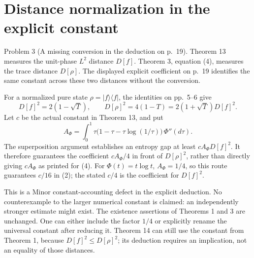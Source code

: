 \documentclass[10pt]{article}
\begin{document}
\section*{Distance normalization in the explicit constant}
Problem 3 (A missing conversion in the deduction on p. 19).  Theorem 13 measures the unit-phase \(L^2\) distance \(D[f]\). Theorem 3, equation (4), measures the trace distance \(D[\rho]\). The displayed explicit coefficient on p. 19 identifies the same constant across these two distances without the conversion.\par
For a normalized pure state \(\rho=|f\rangle\langle f|\), the identities on pp. 5–6 give \[D[f]^2=2(1-\sqrt T),\qquad
 D[\rho]^2=4(1-T)=2(1+\sqrt T)D[f]^2 .\] Let \(c\) be the actual constant in Theorem 13, and put \[A_\Phi=\int_0^1
 \tau\bigl(1-\tau-\tau\log(1/\tau)\bigr)\,\Phi''(d\tau).\] The superposition argument establishes an entropy gap at least \(cA_\Phi D[f]^2\). It therefore guarantees the coefficient \(cA_\Phi/4\) in front of \(D[\rho]^2\), rather than directly giving \(cA_\Phi\) as printed for (4). For \(\Phi(t)=t\log t\), \(A_\Phi=1/4\), so this route guarantees \(c/16\) in (2); the stated \(c/4\) is the coefficient for \(D[f]^2\).\par
This is a Minor constant-accounting defect in the explicit deduction. No counterexample to the larger numerical constant is claimed: an independently stronger estimate might exist. The existence assertions of Theorems 1 and 3 are unchanged. One can either include the factor \(1/4\) or explicitly rename the universal constant after reducing it. Theorem 14 can still use the constant from Theorem 1, because \(D[f]^2\leq D[\rho]^2\); its deduction requires an implication, not an equality of those distances.\par
\end{document}
